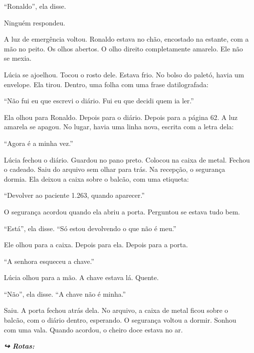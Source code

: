 \noindent ``Ronaldo'', ela disse.

\noindent Ninguém respondeu.

\noindent A luz de emergência voltou. Ronaldo estava no chão, encostado na estante, com a mão no peito. Os olhos abertos. O olho direito completamente amarelo. Ele não se mexia.

\noindent Lúcia se ajoelhou. Tocou o rosto dele. Estava frio. No bolso do paletó, havia um envelope. Ela tirou. Dentro, uma folha com uma frase datilografada:

\noindent ``Não fui eu que escrevi o diário. Fui eu que decidi quem ia ler.''

\noindent Ela olhou para Ronaldo. Depois para o diário. Depois para a página 62. A luz amarela se apagou. No lugar, havia uma linha nova, escrita com a letra dela:

\noindent ``Agora é a minha vez.''

\noindent Lúcia fechou o diário. Guardou no pano preto. Colocou na caixa de metal. Fechou o cadeado. Saiu do arquivo sem olhar para trás. Na recepção, o segurança dormia. Ela deixou a caixa sobre o balcão, com uma etiqueta:

\noindent ``Devolver ao paciente 1.263, quando aparecer.''

\noindent O segurança acordou quando ela abriu a porta. Perguntou se estava tudo bem.

\noindent ``Está'', ela disse. ``Só estou devolvendo o que não é meu.''

\noindent Ele olhou para a caixa. Depois para ela. Depois para a porta.

\noindent ``A senhora esqueceu a chave.''

\noindent Lúcia olhou para a mão. A chave estava lá. Quente.

\noindent ``Não'', ela disse. ``A chave não é minha.''

\noindent Saiu. A porta fechou atrás dela. No arquivo, a caixa de metal ficou sobre o balcão, com o diário dentro, esperando. O segurança voltou a dormir. Sonhou com uma vala. Quando acordou, o cheiro doce estava no ar.

\noindent\textit{\textbf{↪ Rotas:}  \rotasep {} \rotasep {}}
